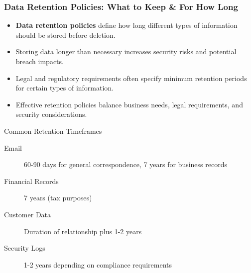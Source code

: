 \documentclass{beamer}
\begin{document}
\begin{frame}
\frametitle{Data Retention Policies: What to Keep \& For How Long}
\begin{itemize}
    \item \textbf{Data retention policies} define how long different types of information should be stored before deletion.
    \item Storing data longer than necessary increases security risks and potential breach impacts.
    \item Legal and regulatory requirements often specify minimum retention periods for certain types of information.
    \item Effective retention policies balance business needs, legal requirements, and security considerations.
\end{itemize}

\begin{exampleblock}{Common Retention Timeframes}
    \begin{description}
        \item[Email] 60-90 days for general correspondence, 7 years for business records
        \item[Financial Records] 7 years (tax purposes)
        \item[Customer Data] Duration of relationship plus 1-2 years
        \item[Security Logs] 1-2 years depending on compliance requirements
    \end{description}
\end{exampleblock}
\end{frame}
\end{document}
